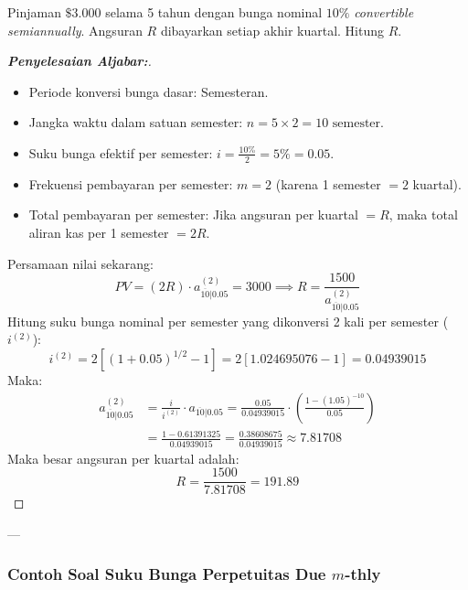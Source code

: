 \documentclass[11pt,a4paper]{article}
\begin{document}
\begin{examplebox}
Pinjaman $\$3.000$ selama 5 tahun dengan bunga nominal $10\%$ \textit{convertible semiannually}. Angsuran $R$ dibayarkan setiap akhir kuartal. Hitung $R$.
\end{examplebox}

\begin{proof}[\textbf{Penyelesaian Aljabar:}]
\begin{itemize}
    \item Periode konversi bunga dasar: Semesteran.
    \item Jangka waktu dalam satuan semester: $n = 5 \times 2 = 10\text{ semester}$.
    \item Suku bunga efektif per semester: $i = \frac{10\%}{2} = 5\% = 0.05$.
    \item Frekuensi pembayaran per semester: $m = 2$ (karena 1 semester $= 2$ kuartal).
    \item Total pembayaran per semester: Jika angsuran per kuartal $= R$, maka total aliran kas per 1 semester $= 2R$.
\end{itemize}
Persamaan nilai sekarang:
\begin{equation*}
    PV = (2R) \cdot a_{\overline{10}|0.05}^{(2)} = 3000 \implies R = \frac{1500}{a_{\overline{10}|0.05}^{(2)}}
\end{equation*}
Hitung suku bunga nominal per semester yang dikonversi 2 kali per semester ($i^{(2)}$):
\begin{equation*}
    i^{(2)} = 2 \left[ (1 + 0.05)^{1/2} - 1 \right] = 2 [1.024695076 - 1] = 0.04939015
\end{equation*}
Maka:
\begin{align*}
    a_{\overline{10}|0.05}^{(2)} &= \frac{i}{i^{(2)}} \cdot a_{\overline{10}|0.05} = \frac{0.05}{0.04939015} \cdot \left(\frac{1 - (1.05)^{-10}}{0.05}\right) \\
    &= \frac{1 - 0.61391325}{0.04939015} = \frac{0.38608675}{0.04939015} \approx 7.81708
\end{align*}
Maka besar angsuran per kuartal adalah:
\begin{equation*}
    R = \frac{1500}{7.81708} = \mathbf{191.89}
\end{equation*}
\end{proof}

---

\subsubsection{Contoh Soal Suku Bunga Perpetuitas Due \texorpdfstring{$m$}{m}-thly}
\end{document}
